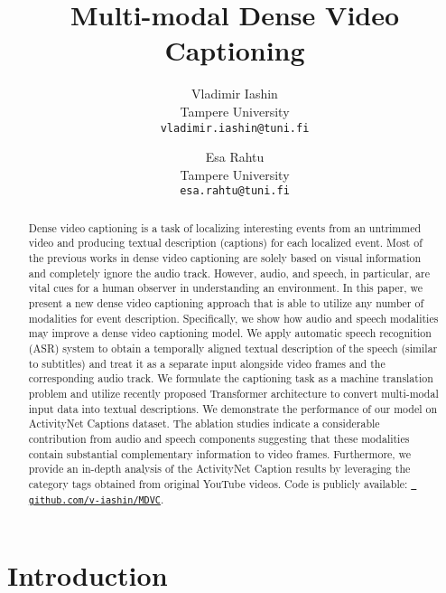 \documentclass[10pt,twocolumn,letterpaper]{article}
\begin{document}
\title{Multi-modal Dense Video Captioning}

\author{Vladimir Iashin \\
Tampere University \\
{\tt\small vladimir.iashin@tuni.fi}
\and
Esa Rahtu\\
Tampere University\\
{\tt\small esa.rahtu@tuni.fi}
}

\maketitle


\begin{abstract}
      Dense video captioning is a task of localizing interesting events from an untrimmed video and producing textual description (captions) for each localized event. Most of the previous works in dense video captioning are solely based on visual information and completely ignore the audio track. However, audio, and speech, in particular, are vital cues for a human observer in understanding an environment. In this paper, we present a new dense video captioning approach that is able to utilize any number of modalities for event description. Specifically, we show how audio and speech modalities may improve a dense video captioning model. We apply automatic speech recognition (ASR) system to obtain a temporally aligned textual description of the speech (similar to subtitles) and treat it as a separate input alongside video frames and the corresponding audio track. We formulate the captioning task as a machine translation problem and utilize recently proposed Transformer architecture to convert multi-modal input data into textual descriptions. We demonstrate the performance of our model on ActivityNet Captions dataset. The ablation studies indicate a considerable contribution from audio and speech components suggesting that these modalities contain substantial complementary information to video frames. Furthermore, we provide an in-depth analysis of the ActivityNet Caption results by leveraging the category tags obtained from original YouTube videos. Code is publicly available: \href{https://github.com/v-iashin/MDVC}{\texttt{\color{blue} github.com/v-iashin/MDVC}}.
\end{abstract}



\section{Introduction}
\end{document}
